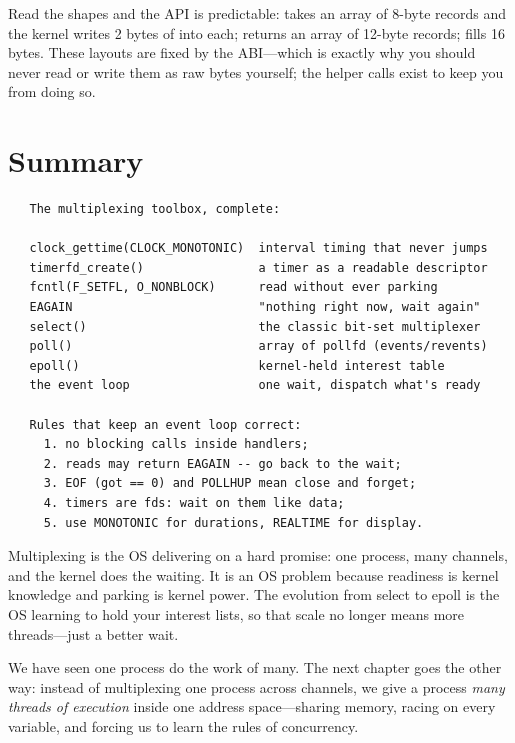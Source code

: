 Read the shapes and the API is predictable:  takes an array
of 8-byte  records and the kernel writes 2 bytes of
 into each;  returns an array of
12-byte  records;  fills 16
bytes. These layouts are fixed by the ABI---which is exactly why you
should never read or write them as raw bytes yourself; the helper
calls exist to keep you from doing so.

\section{Summary}

\begin{verbatim}
   The multiplexing toolbox, complete:

   clock_gettime(CLOCK_MONOTONIC)  interval timing that never jumps
   timerfd_create()                a timer as a readable descriptor
   fcntl(F_SETFL, O_NONBLOCK)      read without ever parking
   EAGAIN                          "nothing right now, wait again"
   select()                        the classic bit-set multiplexer
   poll()                          array of pollfd (events/revents)
   epoll()                         kernel-held interest table
   the event loop                  one wait, dispatch what's ready

   Rules that keep an event loop correct:
     1. no blocking calls inside handlers;
     2. reads may return EAGAIN -- go back to the wait;
     3. EOF (got == 0) and POLLHUP mean close and forget;
     4. timers are fds: wait on them like data;
     5. use MONOTONIC for durations, REALTIME for display.
\end{verbatim}

\begin{osconcept}
Multiplexing is the OS delivering on a hard promise: one process, many
channels, and the kernel does the waiting. It is an OS problem because
readiness is kernel knowledge and parking is kernel power. The
evolution from select to epoll is the OS learning to hold your
interest lists, so that scale no longer means more threads---just a
better wait.
\end{osconcept}

We have seen one process do the work of many. The next chapter goes
the other way: instead of multiplexing one process across channels, we
give a process \emph{many threads of execution} inside one address
space---sharing memory, racing on every variable, and forcing us to
learn the rules of concurrency.

